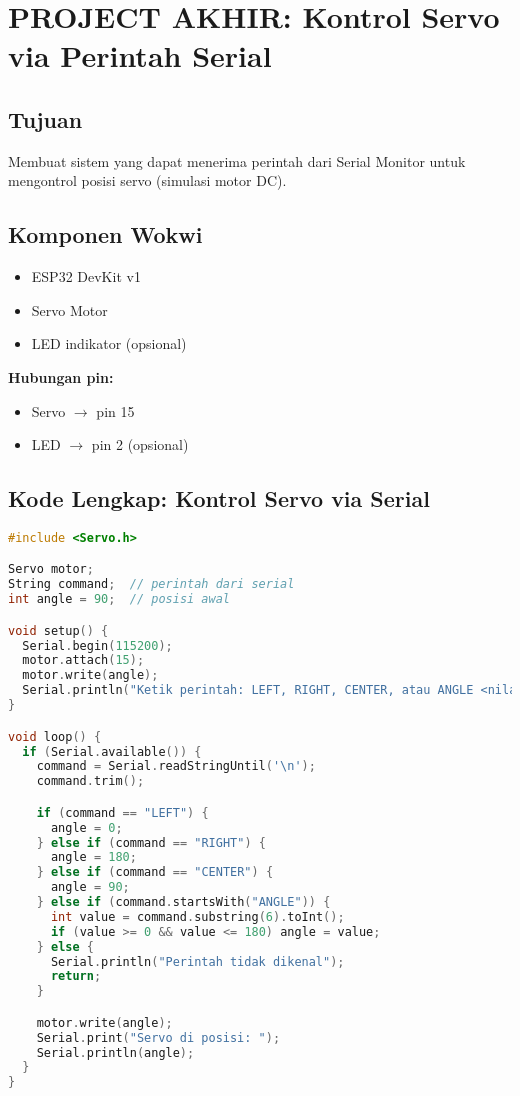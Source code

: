 \documentclass[12pt,a4paper]{article}
\begin{document}
\newpage
\section{PROJECT AKHIR: Kontrol Servo via Perintah Serial}

\subsection{Tujuan}
Membuat sistem yang dapat menerima perintah dari Serial Monitor untuk mengontrol posisi servo (simulasi motor DC).

\subsection{Komponen Wokwi}
\begin{itemize}
    \item ESP32 DevKit v1
    \item Servo Motor
    \item LED indikator (opsional)
\end{itemize}

\textbf{Hubungan pin:}
\begin{itemize}
    \item Servo $\rightarrow$ pin 15
    \item LED $\rightarrow$ pin 2 (opsional)
\end{itemize}

\subsection{Kode Lengkap: Kontrol Servo via Serial}

\begin{lstlisting}[language=C++, caption={Project: Kontrol Servo dengan Serial}]
#include <Servo.h>

Servo motor;
String command;  // perintah dari serial
int angle = 90;  // posisi awal

void setup() {
  Serial.begin(115200);
  motor.attach(15);
  motor.write(angle);
  Serial.println("Ketik perintah: LEFT, RIGHT, CENTER, atau ANGLE <nilai>");
}

void loop() {
  if (Serial.available()) {
    command = Serial.readStringUntil('\n');
    command.trim();

    if (command == "LEFT") {
      angle = 0;
    } else if (command == "RIGHT") {
      angle = 180;
    } else if (command == "CENTER") {
      angle = 90;
    } else if (command.startsWith("ANGLE")) {
      int value = command.substring(6).toInt();
      if (value >= 0 && value <= 180) angle = value;
    } else {
      Serial.println("Perintah tidak dikenal");
      return;
    }

    motor.write(angle);
    Serial.print("Servo di posisi: ");
    Serial.println(angle);
  }
}
\end{lstlisting}
\end{document}
